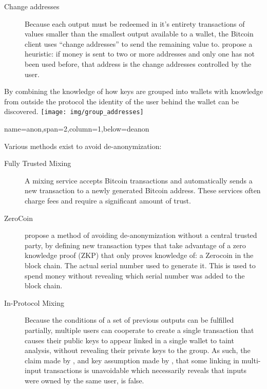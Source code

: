 \documentclass[a0paper,portrait]{baposter}
\begin{document}
\begin{poster}
{\begin{multicols}{2}
\begin{description}
\item[Change addresses]
Because each output must be redeemed in it's entirety transactions of values smaller than the smallest output available to a wallet, the Bitcoin client uses ``change addresses'' to send the remaining value to.\textcite{eval-priv} propose a heuristic: if money is sent to two or more addresses and only one has not been used before, that address is the change addresses controlled by the user.
\end{description}
By combining the knowledge of how keys are grouped into wallets with knowledge from outside the protocol the identity of the user behind the wallet can be discovered\cite{reid-anon}.
\texttt{[image: img/group\_addresses]}
\end{multicols}
}

{name=anon,span=2,column=1,below=deanon}{
\begin{multicols}{2}
Various methods exist to avoid de-anonymization:
\begin{description}
\item[Fully Trusted Mixing]
A mixing service accepts Bitcoin transactions and automatically sends a new transaction to a newly generated Bitcoin address.  These services often charge fees and require a significant amount of trust.
\item[ZeroCoin]
\textcite{zerocoin} propose a method of avoiding de-anonymization without a central trusted party, by defining new transaction types that take advantage of a zero knowledge proof (ZKP) that only proves knowledge of: a Zerocoin in the block chain. The actual serial number used to generate it. This is used to spend money without revealing which serial number was added to the block chain.

\item[In-Protocol Mixing]
Because the conditions of a set of previous outputs can be fulfilled partially, multiple users can cooperate to create a single transaction that causes their public keys to appear linked in a single wallet to taint analysis, without revealing their private keys to the group.  As such, the claim made by \textcite{satoshi}, and key assumption made by \textcite{reid-anon}, that some linking in multi-input transactions is unavoidable which necessarily reveals that inputs were owned by the same user, is false.

\end{description}
\end{multicols}
}


\end{poster}
\end{document}
